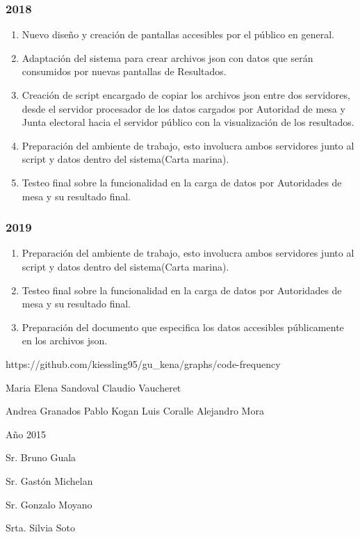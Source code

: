 \subsubsection{2018}
\begin{enumerate}
    \item Nuevo diseño y creación de pantallas accesibles por el público en general.
    \item Adaptación del sistema para crear archivos json con datos que serán consumidos por nuevas pantallas de Resultados.
    \item Creación de script encargado de copiar los archivos json entre dos servidores, desde el servidor procesador de los datos cargados por Autoridad de mesa y Junta electoral hacia el servidor público con la visualización de los resultados.
    \item Preparación del ambiente de trabajo, esto involucra ambos servidores junto al script y datos dentro del sistema(Carta marina).
    \item Testeo final sobre la funcionalidad en la carga de datos por Autoridades de mesa y su resultado final.
\end{enumerate}
\subsubsection{2019}
\begin{enumerate}
    \item Preparación del ambiente de trabajo, esto involucra ambos servidores junto al script y datos dentro del sistema(Carta marina).
    \item Testeo final sobre la funcionalidad en la carga de datos por Autoridades de mesa y su resultado final.
    \item Preparación del documento que especifica los datos accesibles públicamente en los archivos json.
\end{enumerate}

https://github.com/kiessling95/gu_kena/graphs/code-frequency

Maria Elena Sandoval
Claudio Vaucheret

Andrea Granados
Pablo Kogan
Luis Coralle
Alejandro Mora

Año 2015

Sr. Bruno Guala

Sr. Gastón Michelan

Sr. Gonzalo Moyano

Srta. Silvia Soto

